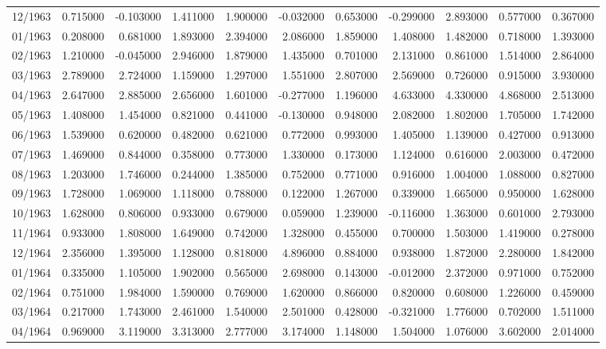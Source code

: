 \begin{tabular}{lrrrrrrrrrr}
12/1963 & 0.715000 & -0.103000 & 1.411000 & 1.900000 & -0.032000 & 0.653000 & -0.299000 & 2.893000 & 0.577000 & 0.367000 \\
01/1963 & 0.208000 & 0.681000 & 1.893000 & 2.394000 & 2.086000 & 1.859000 & 1.408000 & 1.482000 & 0.718000 & 1.393000 \\
02/1963 & 1.210000 & -0.045000 & 2.946000 & 1.879000 & 1.435000 & 0.701000 & 2.131000 & 0.861000 & 1.514000 & 2.864000 \\
03/1963 & 2.789000 & 2.724000 & 1.159000 & 1.297000 & 1.551000 & 2.807000 & 2.569000 & 0.726000 & 0.915000 & 3.930000 \\
04/1963 & 2.647000 & 2.885000 & 2.656000 & 1.601000 & -0.277000 & 1.196000 & 4.633000 & 4.330000 & 4.868000 & 2.513000 \\
05/1963 & 1.408000 & 1.454000 & 0.821000 & 0.441000 & -0.130000 & 0.948000 & 2.082000 & 1.802000 & 1.705000 & 1.742000 \\
06/1963 & 1.539000 & 0.620000 & 0.482000 & 0.621000 & 0.772000 & 0.993000 & 1.405000 & 1.139000 & 0.427000 & 0.913000 \\
07/1963 & 1.469000 & 0.844000 & 0.358000 & 0.773000 & 1.330000 & 0.173000 & 1.124000 & 0.616000 & 2.003000 & 0.472000 \\
08/1963 & 1.203000 & 1.746000 & 0.244000 & 1.385000 & 0.752000 & 0.771000 & 0.916000 & 1.004000 & 1.088000 & 0.827000 \\
09/1963 & 1.728000 & 1.069000 & 1.118000 & 0.788000 & 0.122000 & 1.267000 & 0.339000 & 1.665000 & 0.950000 & 1.628000 \\
10/1963 & 1.628000 & 0.806000 & 0.933000 & 0.679000 & 0.059000 & 1.239000 & -0.116000 & 1.363000 & 0.601000 & 2.793000 \\
11/1964 & 0.933000 & 1.808000 & 1.649000 & 0.742000 & 1.328000 & 0.455000 & 0.700000 & 1.503000 & 1.419000 & 0.278000 \\
12/1964 & 2.356000 & 1.395000 & 1.128000 & 0.818000 & 4.896000 & 0.884000 & 0.938000 & 1.872000 & 2.280000 & 1.842000 \\
01/1964 & 0.335000 & 1.105000 & 1.902000 & 0.565000 & 2.698000 & 0.143000 & -0.012000 & 2.372000 & 0.971000 & 0.752000 \\
02/1964 & 0.751000 & 1.984000 & 1.590000 & 0.769000 & 1.620000 & 0.866000 & 0.820000 & 0.608000 & 1.226000 & 0.459000 \\
03/1964 & 0.217000 & 1.743000 & 2.461000 & 1.540000 & 2.501000 & 0.428000 & -0.321000 & 1.776000 & 0.702000 & 1.511000 \\
04/1964 & 0.969000 & 3.119000 & 3.313000 & 2.777000 & 3.174000 & 1.148000 & 1.504000 & 1.076000 & 3.602000 & 2.014000 \\

\end{tabular}
